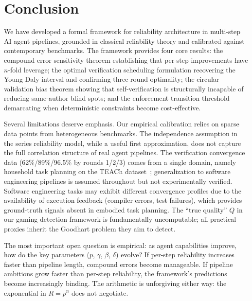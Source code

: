\documentclass[11pt, a4paper, logo, copyright]{googledeepmind}
\begin{document}
\section{Conclusion}
\label{sec:conclusion}

We have developed a formal framework for reliability architecture in multi-step AI agent pipelines, grounded in classical reliability theory and calibrated against contemporary benchmarks.
The framework provides four core results: the compound error sensitivity theorem establishing that per-step improvements have $n$-fold leverage; the optimal verification scheduling formulation recovering the Young-Daly interval and confirming three-round optimality; the circular validation bias theorem showing that self-verification is structurally incapable of reducing same-author blind spots; and the enforcement transition threshold demarcating when deterministic constraints become cost-effective.

Several limitations deserve emphasis.
Our empirical calibration relies on sparse data points from heterogeneous benchmarks.
The independence assumption in the series reliability model, while a useful first approximation, does not capture the full correlation structure of real agent pipelines.
The verification convergence data (62\%/89\%/96.5\% by rounds 1/2/3) comes from a single domain, namely household task planning on the TEACh dataset~\citep{hariharan2025plan}; generalization to software engineering pipelines is assumed throughout but not experimentally verified.
Software engineering tasks may exhibit different convergence profiles due to the availability of execution feedback (compiler errors, test failures), which provides ground-truth signals absent in embodied task planning.
The ``true quality'' $Q$ in our gaming detection framework is fundamentally uncomputable; all practical proxies inherit the Goodhart problem they aim to detect.

The most important open question is empirical: as agent capabilities improve, how do the key parameters ($p$, $\gamma$, $\beta$, $\delta$) evolve?
If per-step reliability increases faster than pipeline length, compound errors become manageable.
If pipeline ambitions grow faster than per-step reliability, the framework's predictions become increasingly binding.
The arithmetic is unforgiving either way: the exponential in $R = p^n$ does not negotiate.
\end{document}
